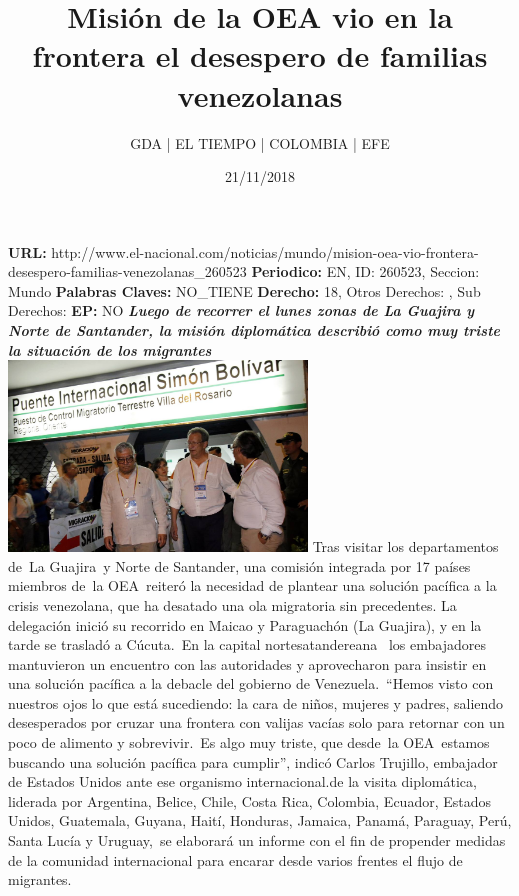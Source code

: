 \documentclass{article}%
\title{\textbf{Misión de la OEA vio en la frontera el desespero de familias venezolanas}}%
\author{GDA | EL TIEMPO | COLOMBIA | EFE}%
\date{21/11/2018}%
\begin{document}
%
\normalsize%
\maketitle%
\textbf{URL: }%
http://www.el{-}nacional.com/noticias/mundo/mision{-}oea{-}vio{-}frontera{-}desespero{-}familias{-}venezolanas\_260523\newline%
%
\textbf{Periodico: }%
EN, %
ID: %
260523, %
Seccion: %
Mundo\newline%
%
\textbf{Palabras Claves: }%
NO\_TIENE\newline%
%
\textbf{Derecho: }%
18, %
Otros Derechos: %
, %
Sub Derechos: %
\newline%
%
\textbf{EP: }%
NO\newline%
\newline%
%
\textbf{\textit{Luego de recorrer el lunes zonas de La Guajira y Norte de Santander, la misión diplomática describió como muy triste la situación de los migrantes}}%
\newline%
\newline%
%
\includegraphics[width=300px]{160.jpg}%
\newline%
%
Tras visitar los departamentos de~La Guajira~y Norte de Santander, una comisión integrada por 17 países miembros de~la OEA~reiteró la necesidad de plantear una solución pacífica a la crisis venezolana, que ha desatado una ola migratoria sin precedentes.%
\newline%
%
La delegación inició su recorrido en Maicao y Paraguachón (La Guajira), y en la tarde se trasladó a Cúcuta.~En la capital nortesatandereana ~los embajadores mantuvieron un encuentro con las autoridades y aprovecharon para insistir en una solución pacífica a la debacle del gobierno de Venezuela.~“Hemos visto con nuestros ojos lo que está sucediendo: la cara de niños, mujeres y padres, saliendo desesperados por cruzar una frontera con valijas vacías solo para retornar con un poco de alimento y sobrevivir.~Es algo muy triste, que desde~la OEA~estamos buscando una solución pacífica para cumplir”, indicó Carlos Trujillo, embajador de Estados Unidos ante ese organismo internacional.de la visita diplomática, liderada por Argentina, Belice, Chile, Costa Rica, Colombia, Ecuador, Estados Unidos, Guatemala, Guyana, Haití, Honduras, Jamaica, Panamá, Paraguay, Perú, Santa Lucía y Uruguay,~se elaborará un informe con el fin de propender medidas de la comunidad internacional para encarar desde varios frentes el flujo de migrantes.%
\end{document}
